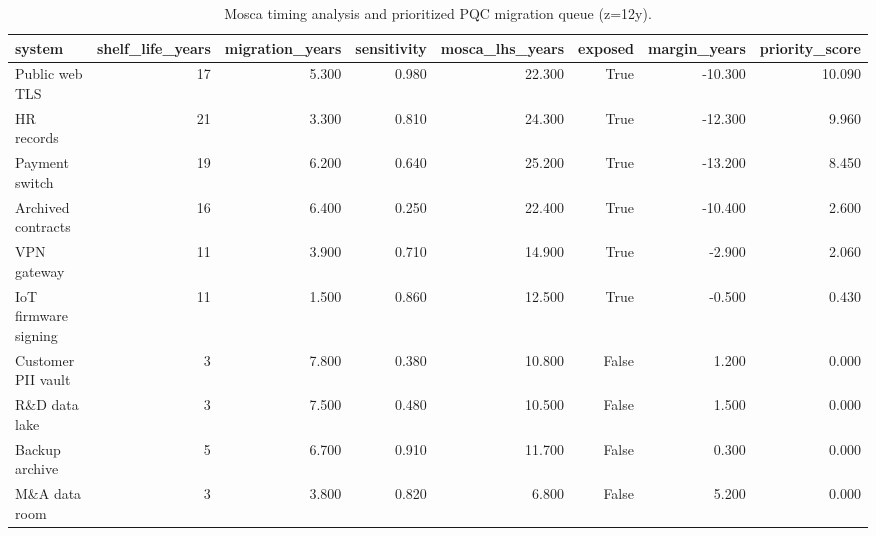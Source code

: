 \begin{table}
\caption{Mosca timing analysis and prioritized PQC migration queue (z=12y).}
\label{tab:mosca}
\begin{tabular}{lrrrrrrr}
\toprule
system & shelf\_life\_years & migration\_years & sensitivity & mosca\_lhs\_years & exposed & margin\_years & priority\_score \\
\midrule
Public web TLS & 17 & 5.300 & 0.980 & 22.300 & True & -10.300 & 10.090 \\
HR records & 21 & 3.300 & 0.810 & 24.300 & True & -12.300 & 9.960 \\
Payment switch & 19 & 6.200 & 0.640 & 25.200 & True & -13.200 & 8.450 \\
Archived contracts & 16 & 6.400 & 0.250 & 22.400 & True & -10.400 & 2.600 \\
VPN gateway & 11 & 3.900 & 0.710 & 14.900 & True & -2.900 & 2.060 \\
IoT firmware signing & 11 & 1.500 & 0.860 & 12.500 & True & -0.500 & 0.430 \\
Customer PII vault & 3 & 7.800 & 0.380 & 10.800 & False & 1.200 & 0.000 \\
R\&D data lake & 3 & 7.500 & 0.480 & 10.500 & False & 1.500 & 0.000 \\
Backup archive & 5 & 6.700 & 0.910 & 11.700 & False & 0.300 & 0.000 \\
M\&A data room & 3 & 3.800 & 0.820 & 6.800 & False & 5.200 & 0.000 \\
\bottomrule
\end{tabular}
\end{table}
